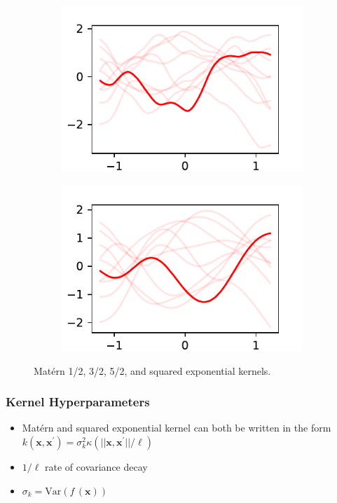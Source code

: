 \documentclass{beamer}
\begin{document}
\begin{frame}
\begin{figure}
\begin{subfigure}[t]{0.4\textwidth}
        \end{subfigure}
        \begin{subfigure}[t]{0.4\textwidth}
            \centering
            \includegraphics[width=\textwidth]{maternfivehalves_kernel.pdf}
        \end{subfigure}%
        \begin{subfigure}[t]{0.4\textwidth}
            \centering
            \includegraphics[width=\textwidth]{exponentiated_kernel.pdf}
        \end{subfigure}%
        \caption{
            Mat\'ern 1/2, 3/2, 5/2, and squared exponential kernels.
        }
    \end{figure}
\end{frame}

\begin{frame}
    \frametitle{Kernel Hyperparameters}
    \begin{itemize}
        \item Mat\'ern and squared exponential kernel can both be written in the
              form $k(\mathbf{x}, \mathbf{x}^\prime)
                  = \sigma_k^2\kappa(||\mathbf{x}, \mathbf{x}^\prime||/\ell)$
        \item $1/\ell$ rate of covariance decay
        \item $\sigma_k = \mathrm{Var}(f\,(\mathbf{x}))$
    \end{itemize}
\end{frame}
\end{document}
